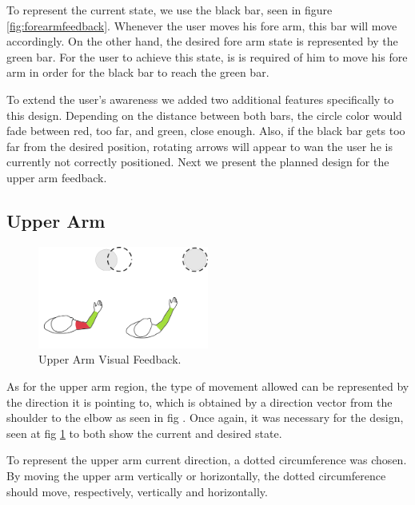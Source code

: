 To represent the current state, we use the black bar, seen in figure \ref{fig:forearmfeedback}. Whenever the user moves his fore arm, this bar will move accordingly.
On the other hand, the desired fore arm state is represented by the green bar. 
For the user to achieve this state, is is required of him to move his fore arm in order for the black bar to reach the green bar.

To extend the user's awareness we added two additional features specifically to this design. 
Depending on the distance between both bars, the circle color would fade between red, too far, and green, close enough. 
Also, if the black bar gets too far from the desired position, rotating arrows will appear to wan the user he is currently not correctly positioned. 
Next we present the planned design for the upper arm feedback.

\subsection{Upper Arm}

\begin{figure}[!t]
    \begin{center}
        \includegraphics[width=0.5\textwidth]{imgs/approach/upperarmfeedback.png}
    \end{center}
    \caption{Upper Arm Visual Feedback.}
    \label{fig:upperarmfeedback}
\end{figure}

As for the upper arm region, the type of movement allowed can be represented by the direction it is pointing to, 
which is obtained by a direction vector from the shoulder to the elbow as seen in fig .
Once again, it was necessary for the design, seen at fig \ref{fig:upperarmfeedback} to both show the current and desired state. 


To represent the upper arm current direction, a dotted circumference was chosen. 
By moving the upper arm vertically or horizontally, the dotted circumference should move, respectively, vertically and horizontally.

